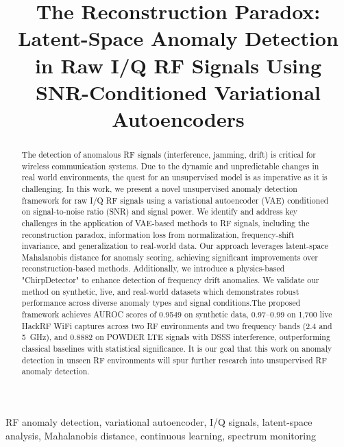 \documentclass[conference]{IEEEtran}
\begin{document}
\title{The Reconstruction Paradox: Latent-Space Anomaly Detection in Raw I/Q RF Signals Using SNR-Conditioned Variational Autoencoders}

\author{%
}

\maketitle

\begin{abstract}
The detection of anomalous RF signals (interference, jamming, drift) is critical for wireless communication systems. Due to the dynamic and unpredictable changes in real world environments, the quest for an unsupervised model is as imperative as it is challenging. In this work, we present a novel unsupervised anomaly detection framework for raw I/Q RF signals using a variational autoencoder (VAE) conditioned on signal-to-noise ratio (SNR) and signal power. We identify and address key challenges in the application of VAE-based methods to RF signals, including the reconstruction paradox, information loss from normalization, frequency-shift invariance, and generalization to real-world data. Our approach leverages latent-space Mahalanobis distance for anomaly scoring, achieving significant improvements over reconstruction-based methods. Additionally, we introduce a physics-based "ChirpDetector" to enhance detection of frequency drift anomalies. We validate our method on synthetic, live, and real-world datasets which demonstrates robust performance across diverse anomaly types and signal conditions.The proposed framework achieves AUROC scores of 0.9549 on synthetic data, 0.97--0.99 on 1{,}700 live HackRF WiFi captures across two RF environments and two frequency bands (2.4 and 5~GHz), and 0.8882 on POWDER LTE signals with DSSS interference, outperforming classical baselines with statistical significance. It is our goal that this work on anomaly detection in unseen RF environments will spur further research into unsupervised RF anomaly detection.

\end{abstract}

\begin{IEEEkeywords}
RF anomaly detection, variational autoencoder, I/Q signals, latent-space analysis, Mahalanobis distance, continuous learning, spectrum monitoring
\end{IEEEkeywords}
\end{document}
